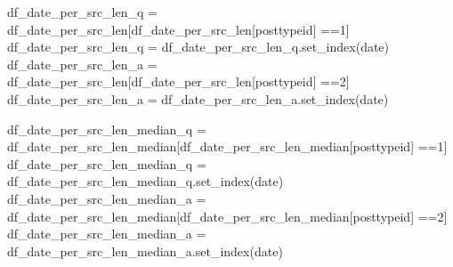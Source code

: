 \documentclass[
  letterpaper,
  DIV=11,
  numbers=noendperiod]{scrartcl}
\newenvironment{Shaded}{\begin{snugshade}}{\end{snugshade}}
\newcommand{\NormalTok}[1]{\textcolor[rgb]{0.00,0.23,0.31}{#1}}
\newcommand{\OperatorTok}[1]{\textcolor[rgb]{0.37,0.37,0.37}{#1}}
\newcommand{\StringTok}[1]{\textcolor[rgb]{0.13,0.47,0.30}{#1}}
\begin{document}
\begin{Shaded}
\begin{Highlighting}[]
\NormalTok{df\_date\_per\_src\_len\_q }\OperatorTok{=}\NormalTok{ df\_date\_per\_src\_len[df\_date\_per\_src\_len[}\StringTok{\textquotesingle{}posttypeid\textquotesingle{}}\NormalTok{] }\OperatorTok{==}\StringTok{\textquotesingle{}1\textquotesingle{}}\NormalTok{]}
\NormalTok{df\_date\_per\_src\_len\_q }\OperatorTok{=}\NormalTok{ df\_date\_per\_src\_len\_q.set\_index(}\StringTok{\textquotesingle{}date\textquotesingle{}}\NormalTok{)}
\NormalTok{df\_date\_per\_src\_len\_a }\OperatorTok{=}\NormalTok{ df\_date\_per\_src\_len[df\_date\_per\_src\_len[}\StringTok{\textquotesingle{}posttypeid\textquotesingle{}}\NormalTok{] }\OperatorTok{==}\StringTok{\textquotesingle{}2\textquotesingle{}}\NormalTok{]}
\NormalTok{df\_date\_per\_src\_len\_a }\OperatorTok{=}\NormalTok{ df\_date\_per\_src\_len\_a.set\_index(}\StringTok{\textquotesingle{}date\textquotesingle{}}\NormalTok{)}
\end{Highlighting}
\end{Shaded}

\begin{Shaded}
\begin{Highlighting}[]
\NormalTok{df\_date\_per\_src\_len\_median\_q }\OperatorTok{=}\NormalTok{ df\_date\_per\_src\_len\_median[df\_date\_per\_src\_len\_median[}\StringTok{\textquotesingle{}posttypeid\textquotesingle{}}\NormalTok{] }\OperatorTok{==}\StringTok{\textquotesingle{}1\textquotesingle{}}\NormalTok{]}
\NormalTok{df\_date\_per\_src\_len\_median\_q }\OperatorTok{=}\NormalTok{ df\_date\_per\_src\_len\_median\_q.set\_index(}\StringTok{\textquotesingle{}date\textquotesingle{}}\NormalTok{)}
\NormalTok{df\_date\_per\_src\_len\_median\_a }\OperatorTok{=}\NormalTok{ df\_date\_per\_src\_len\_median[df\_date\_per\_src\_len\_median[}\StringTok{\textquotesingle{}posttypeid\textquotesingle{}}\NormalTok{] }\OperatorTok{==}\StringTok{\textquotesingle{}2\textquotesingle{}}\NormalTok{]}
\NormalTok{df\_date\_per\_src\_len\_median\_a }\OperatorTok{=}\NormalTok{ df\_date\_per\_src\_len\_median\_a.set\_index(}\StringTok{\textquotesingle{}date\textquotesingle{}}\NormalTok{)}
\end{Highlighting}
\end{Shaded}
\end{document}

